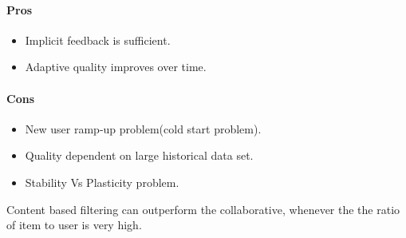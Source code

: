 \paragraph{Pros}\hfill
\begin{itemize}
\item Implicit feedback is sufficient.
\item Adaptive quality improves over time.
\end{itemize}
\paragraph{Cons}\hfill
\begin{itemize}
\item New user ramp-up problem(cold start problem).
\item Quality dependent on large historical data set.
\item Stability Vs Plasticity problem.

\end{itemize}
Content based filtering can outperform the collaborative, whenever the the ratio of item to user is very high.
